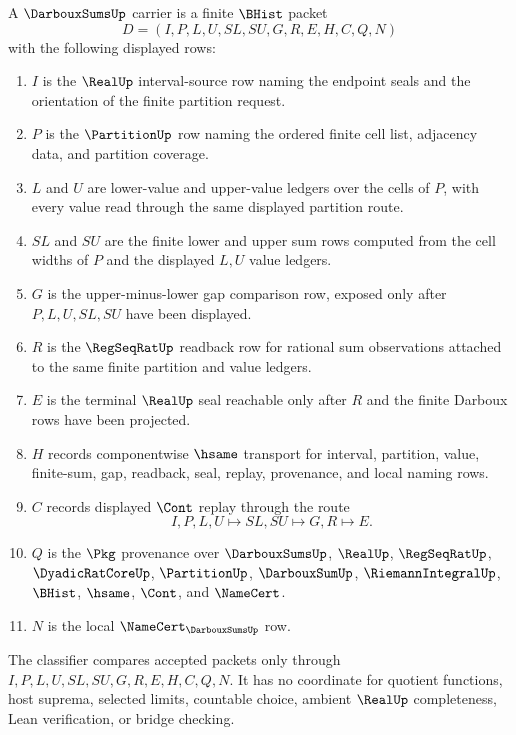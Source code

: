\begin{definition}
\label{def:darboux-sums-carrier}
A $\DarbouxSumsUp$ carrier is a finite $\BHist$ packet
$$
D=(I,P,L,U,SL,SU,G,R,E,H,C,Q,N)
$$
with the following displayed rows:
\begin{enumerate}
\item $I$ is the $\RealUp$ interval-source row naming the endpoint seals and the orientation of the finite partition request.
\item $P$ is the $\PartitionUp$ row naming the ordered finite cell list, adjacency data, and partition coverage.
\item $L$ and $U$ are lower-value and upper-value ledgers over the cells of $P$, with every value read through the same displayed partition route.
\item $SL$ and $SU$ are the finite lower and upper sum rows computed from the cell widths of $P$ and the displayed $L,U$ value ledgers.
\item $G$ is the upper-minus-lower gap comparison row, exposed only after $P,L,U,SL,SU$ have been displayed.
\item $R$ is the $\RegSeqRatUp$ readback row for rational sum observations attached to the same finite partition and value ledgers.
\item $E$ is the terminal $\RealUp$ seal reachable only after $R$ and the finite Darboux rows have been projected.
\item $H$ records componentwise $\hsame$ transport for interval, partition, value, finite-sum, gap, readback, seal, replay, provenance, and local naming rows.
\item $C$ records displayed $\Cont$ replay through the route
$$
I,P,L,U \longmapsto SL,SU \longmapsto G,R \longmapsto E .
$$
\item $Q$ is the $\Pkg$ provenance over $\DarbouxSumsUp$, $\RealUp$, $\RegSeqRatUp$, $\DyadicRatCoreUp$, $\PartitionUp$, $\DarbouxSumUp$, $\RiemannIntegralUp$, $\BHist$, $\hsame$, $\Cont$, and $\NameCert$.
\item $N$ is the local $\NameCert_{\DarbouxSumsUp}$ row.
\end{enumerate}
The classifier compares accepted packets only through $I,P,L,U,SL,SU,G,R,E,H,C,Q,N$. It has no coordinate for quotient functions, host suprema, selected limits, countable choice, ambient $\RealUp$ completeness, Lean verification, or bridge checking.
\end{definition}

